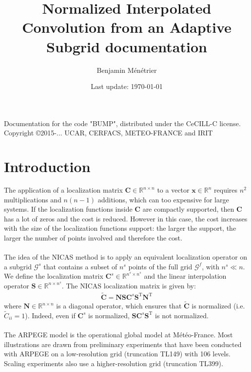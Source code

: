 \documentclass[12pt]{scrartcl}
\begin{document}
\title{\vspace{-1.2cm}Normalized Interpolated Convolution from an Adaptive Subgrid documentation}
\author{Benjamin Ménétrier}
\date{Last update: \today\vspace{-0.5cm}}

\thispagestyle{empty}

\maketitle

\begin{center}
Documentation for the code "BUMP", distributed under the CeCILL-C license.\\
Copyright \copyright 2015-... UCAR, CERFACS, METEO-FRANCE and IRIT
\end{center}
  
\tableofcontents

\clearpage

\section{Introduction}
The application of a localization matrix $\mathbf{C} \in \mathbb{R}^{n \times n}$ to a vector $\mathbf{x} \in \mathbb{R}^n$ requires $n^2$ multiplications and $n(n-1)$ additions, which can too expensive for large systems. If the localization functions inside $\mathbf{C}$ are compactly supported, then $\mathbf{C}$ has a lot of zeros and the cost is reduced. However in this case, the cost increases with the size of the localization functions support: the larger the support, the larger the number of points involved and therefore the cost.\\
$  $\\
The idea of the NICAS method is to apply an equivalent localization operator on a subgrid $\mathcal{G}^s$ that contains a subset of $n^s$ points of the full grid $\mathcal{G}^f$, with $n^s \ll n$. We define the localization matrix $\mathbf{C}^s \in \mathbb{R}^{n^s \times n^s}$ and the linear interpolation operator $\mathbf{S} \in \mathbb{R}^{n \times n^s}$. The NICAS localization matrix is given by:
\begin{align}
\label{eq:nicas}
\widetilde{\mathbf{C}} = \mathbf{N} \mathbf{S} \mathbf{C}^s \mathbf{S}^\mathrm{T} \mathbf{N}^\mathrm{T}
\end{align}
where $\mathbf{N} \in \mathbb{R}^{n \times n}$ is a diagonal operator, which ensures that $\widetilde{\mathbf{C}}$ is normalized (i.e. $\widetilde{C}_{ii} = 1$). Indeed, even if $\mathbf{C}^s$ is normalized, $\mathbf{S} \mathbf{C}^s \mathbf{S}^\mathrm{T}$ is not normalized.\\
$  $\\
The ARPEGE model is the operational global model at Météo-France. Most illustrations are drawn from preliminary experiments that have been conducted with ARPEGE on a low-resolution grid (truncation TL149) with 106 levels. Scaling experiments also use a higher-resolution grid (truncation TL399).
\end{document}
